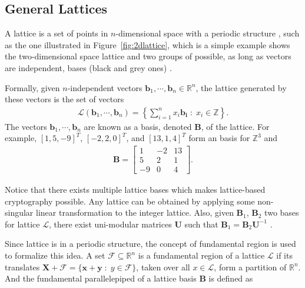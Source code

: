 \subsection{General Lattices}
\par A lattice is a set of points in $n$-dimensional space with a periodic structure , such as the one illustrated in Figure~\ref{fig:2dlattice}, which is a simple example shows the two-dimensional space lattice and two groups of possible, as long as vectors are independent, bases (black and grey ones) \cite{DO}.
\par Formally, given $n$-independent vectors $\mathbf{b}_{1}, \cdots, \mathbf{b}_{n} \in \mathbb{R}^{n}$, the lattice generated by these vectors is the set of vectors
\begin{align}
	\mathcal{L}(\mathbf{b}_{1}, \cdots, \mathbf{b}_{n}) = \left\lbrace \sum_{i=1}^{n} x_{i}\mathbf{b_{i}} \; : \; x_{i} \in \mathbb{Z} \right\rbrace.
\end{align}
The vectors $\mathbf{b}_{1}, \cdots, \mathbf{b}_{n}$ are known as a basis, denoted $\mathbf{B}$, of the lattice. For example, $\left[1, 5, -9\right]^{T}$, $\left[-2, 2, 0\right]^{T}$, and $\left[13, 1, 4\right]^{T}$ form an basis for $\mathbb{Z}^{3}$ and
\begin{align*}
\mathbf{B} = \begin{bmatrix}
1 & -2 & 13 \\
5 & 2 & 1 \\
-9 & 0 & 4
\end{bmatrix}.
\end{align*}
\par Notice that there exists multiple lattice bases which makes lattice-based cryptography possible. Any lattice can be obtained by applying some non-singular linear transformation to the integer lattice. Also, given $\mathbf{B}_{1}$, $\mathbf{B}_{2}$ two bases for lattice $\mathcal{L}$, there exist uni-modular matrices $\mathbf{U}$ such that $\mathbf{B}_{1} = \mathbf{B}_{2}\mathbf{U}^{-1}$ \cite{DO}.
\par Since lattice is in a periodic structure, the concept of fundamental region is used to formalize this idea. A set $\mathcal{F} \subseteq \mathbb{R}^{n}$ is a fundamental region of a lattice $\mathcal{L}$ if its translates $\mathbf{X} + \mathcal{F} = \{ \mathbf{x} + \mathbf{y} \;:\; y \in \mathcal{F} \}$, taken over all $x \in \mathcal{L}$, form a partition of $\mathbb{R}^{n}$. And the fundamental parallelepiped of a lattice basis $\mathbf{B}$ is defined as
